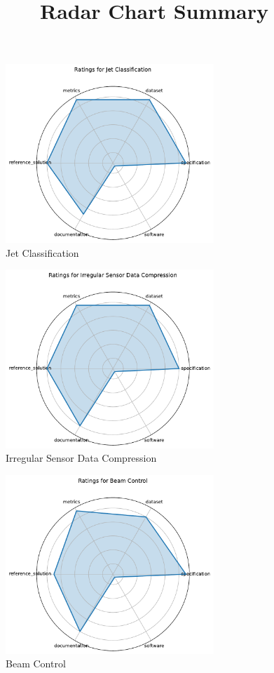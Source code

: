 \documentclass{article}
\title{Radar Chart Summary}
\date{}
\begin{document}
\maketitle

\begin{figure}[h!]
  \centering
  \includegraphics[width=0.7\textwidth]{Jet Classification_radar.pdf}
  \caption{Jet Classification}
\end{figure}

\begin{figure}[h!]
  \centering
  \includegraphics[width=0.7\textwidth]{Irregular Sensor Data Compression_radar.pdf}
  \caption{Irregular Sensor Data Compression}
\end{figure}

\begin{figure}[h!]
  \centering
  \includegraphics[width=0.7\textwidth]{Beam Control_radar.pdf}
  \caption{Beam Control}
\end{figure}
\end{document}
